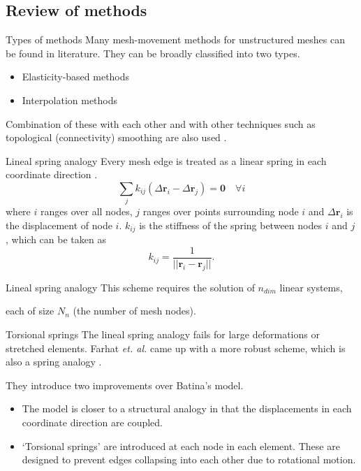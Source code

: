 \documentclass[t,12pt]{beamer}
\begin{document}
\subsection{Review of methods}

\begin{frame}{Types of methods}
Many mesh-movement methods for unstructured meshes can be found in literature. They can be broadly classified into two types.
\vspace{0.2in}
\begin{itemize}
	\item Elasticity-based methods
	\item Interpolation methods
\end{itemize}
\vspace{0.2in}
Combination of these with each other and with other techniques such as topological (connectivity) smoothing are also used .
\end{frame}

\begin{frame}{Lineal spring analogy}
	Every mesh edge is treated as a linear spring in each coordinate direction .
	 \begin{equation}
	 \sum_j k_{ij}(\Delta \mathbf{r}_i - \Delta \mathbf{r}_j) = \mathbf{0} \quad \forall i
	 \label{spring}
	 \end{equation}
	 where $i$ ranges over all nodes, $j$ ranges over points surrounding node $i$ and $\Delta \mathbf{r}_i$ is the displacement of node $i$.
	 $k_{ij}$ is the stiffness of the spring between nodes $i$ and $j$, which can be taken as
	 \begin{equation}
	 k_{ij} = \frac{1}{||\mathbf{r}_i - \mathbf{r}_j||}.
	 \end{equation}
\end{frame}
\begin{frame}{Lineal spring analogy}
	\vspace{0.5in}
	This scheme requires the solution of $n_{dim}$ linear systems,
	
	each of size $N_n$ (the number of mesh nodes).
\end{frame}

\begin{frame}{Torsional springs}
The lineal spring analogy fails for large deformations or stretched elements. Farhat \emph{et. al.} came up with a more robust scheme, which is also a spring analogy .

They introduce two improvements over Batina's model.
\begin{itemize}
	\item The model is closer to a structural analogy in that the displacements in each coordinate direction are coupled.
	\item `Torsional springs' are introduced at each node in each element. These are designed to prevent edges collapsing into each other due to rotational motion.
\end{itemize}
\end{frame}
\end{document}
